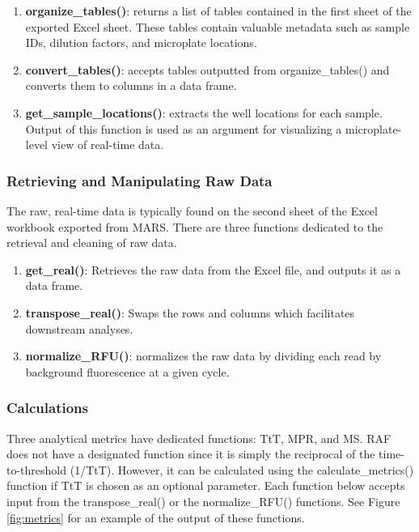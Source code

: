 \documentclass[preprint,12pt,a4paper]{elsarticle}
\begin{document}
                \begin{enumerate}
                    \item \textbf{organize\_tables()}: returns a list of tables contained in the first sheet of the exported Excel sheet. These tables contain valuable metadata such as sample IDs, dilution factors, and microplate locations.
                    \item \textbf{convert\_tables()}: accepts tables outputted from organize\_tables() and converts them to columns in a data frame.
                    \item \textbf{get\_sample\_locations()}: extracts the well locations for each sample. Output of this function is used as an argument for visualizing a microplate-level view of real-time data.
                \end{enumerate}

            \subsubsection{Retrieving and Manipulating Raw Data}
                The raw, real-time data is typically found on the second sheet of the Excel workbook exported from MARS. There are three functions dedicated to the retrieval and cleaning of raw data.

                \begin{enumerate}
                    \item \textbf{get\_real()}: Retrieves the raw data from the Excel file, and outputs it as a data frame.
                    \item \textbf{transpose\_real()}: Swaps the rows and columns which facilitates downstream analyses.
                    \item \textbf{normalize\_RFU()}: normalizes the raw data by dividing each read by background fluorescence at a given cycle.
                \end{enumerate}

            \subsubsection{Calculations}
                Three analytical metrics have dedicated functions: TtT, MPR, and MS. RAF does not have a designated function since it is simply the reciprocal of the time-to-threshold (1/TtT). However, it can be calculated using the calculate\_metrics() function if TtT is chosen as an optional parameter. Each function below accepts input from the transpose\_real() or the normalize\_RFU() functions. See Figure \ref{fig:metrics} for an example of the output of these functions.
\end{document}
